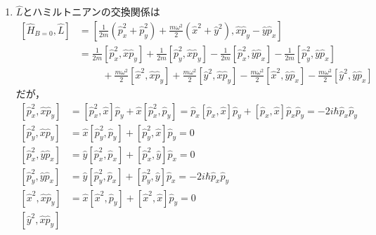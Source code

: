 \documentclass[a4paper,pdflatex,ja=standard]{bxjsarticle}
\begin{document}
\begin{enumerate}
  \item 
  $\hat{L}$とハミルトニアンの交換関係は
  \begin{align}
    \left[  
      \hat{H}_{B=0},\hat{L}
    \right]
    &=
    \left[  
      \frac{1}{2m}(\hat{p}_{x}^2+\hat{p}_{y}^2)
      +
      \frac{m\omega^2}{2}(\hat{x}^2+\hat{y}^2)
      ,
      \hat{x}\hat{p}_{y}-\hat{y}\hat{p}_{x}
    \right]
    \nonumber
    \\
    &=
    \frac{1}{2m}\left[ \hat{p}_{x}^2,\hat{x}\hat{p}_{y} \right]
    +
    \frac{1}{2m}\left[ \hat{p}_{y}^2,\hat{x}\hat{p}_{y} \right]
    -
    \frac{1}{2m}\left[ \hat{p}_{x}^2,\hat{y}\hat{p}_{x} \right]
    -
    \frac{1}{2m}\left[ \hat{p}_{y}^2,\hat{y}\hat{p}_{x} \right]
    \nonumber
    \\
    &\hspace{1cm}
    +
    \frac{m\omega^2}{2}\left[ \hat{x}^2,\hat{x}\hat{p}_{y} \right]
    +
    \frac{m\omega^2}{2}\left[ \hat{y}^2,\hat{x}\hat{p}_{y} \right]
    -
    \frac{m\omega^2}{2}\left[ \hat{x}^2,\hat{y}\hat{p}_{x} \right]
    -
    \frac{m\omega^2}{2}\left[ \hat{y}^2,\hat{y}\hat{p}_{x} \right]
    \label{HL}
  \end{align}
  だが，
  \begin{align}
    \left[ \hat{p}_{x}^2,\hat{x}\hat{p}_{y} \right]
    &=
    \left[ \hat{p}_{x}^2,\hat{x} \right]\hat{p}_{y}
    +
    \hat{x}\left[ \hat{p}_{x}^2,\hat{p}_{y} \right]
    =
    \hat{p}_{x}\left[ \hat{p}_{x},\hat{x} \right]\hat{p}_{y}
    +
    \left[ \hat{p}_{x},\hat{x} \right]\hat{p}_{x}\hat{p}_{y}
    =
    -2i\hbar\hat{p}_{x}\hat{p}_{y}
    \\
    \left[ \hat{p}_{y}^2,\hat{x}\hat{p}_{y} \right]
    &=
    \hat{x}\left[ \hat{p}_{y}^2,\hat{p}_{y} \right]
    +
    \left[ \hat{p}_{y}^2,\hat{x} \right]\hat{p}_{y}
    =
    0
    \\
    \left[ \hat{p}_{x}^2,\hat{y}\hat{p}_{x} \right]
    &=
    \hat{y}\left[ \hat{p}_{x}^2,\hat{p}_{x} \right]
    +
    \left[ \hat{p}_{x}^2,\hat{y} \right]\hat{p}_{x}
    =
    0
    \\
    \left[ \hat{p}_{y}^2,\hat{y}\hat{p}_{x} \right]
    &=
    \hat{y}\left[ \hat{p}_{y}^2,\hat{p}_{x} \right]
    +
    \left[ \hat{p}_{y}^2,\hat{y} \right]\hat{p}_{x}
    =
    -2i\hbar\hat{p}_{x}\hat{p}_{y}
    \\
    \left[ \hat{x}^2,\hat{x}\hat{p}_{y} \right]
    &=
    \hat{x}\left[ \hat{x}^2,\hat{p}_{y} \right]
    +
    \left[ \hat{x}^2,\hat{x} \right]\hat{p}_{y}
    =
    0
    \\
    \left[ \hat{y}^2,\hat{x}\hat{p}_{y} \right]

\end{align}
\end{enumerate}
\end{document}
